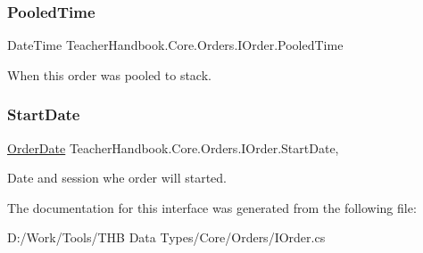 \subsubsection{\texorpdfstring{Pooled\+Time}{PooledTime}}
{\footnotesize\ttfamily Date\+Time Teacher\+Handbook.\+Core.\+Orders.\+I\+Order.\+Pooled\+Time\hspace{0.3cm}{\ttfamily [get]}}



When this order was pooled to stack. 

\mbox{\label{interface_teacher_handbook_1_1_core_1_1_orders_1_1_i_order_a095dc6b1b492dee172826971fa7ec0b2}} 
\subsubsection{\texorpdfstring{Start\+Date}{StartDate}}
{\footnotesize\ttfamily \mbox{\hyperlink{struct_teacher_handbook_1_1_core_1_1_orders_1_1_order_date}{Order\+Date}} Teacher\+Handbook.\+Core.\+Orders.\+I\+Order.\+Start\+Date\hspace{0.3cm}{\ttfamily [get]}, {\ttfamily [set]}}



Date and session whe order will started. 



The documentation for this interface was generated from the following file\+:\begin{DoxyCompactItemize}
\item 
D\+:/\+Work/\+Tools/\+T\+H\+B Data Types/\+Core/\+Orders/I\+Order.\+cs\end{DoxyCompactItemize}
